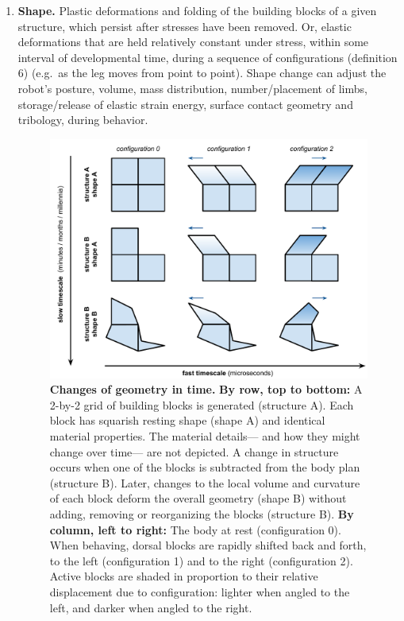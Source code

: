 \begin{enumerate}
    
    \item \textbf{Shape.} Plastic deformations and folding of the building blocks of a given structure, which persist after stresses have been removed.
    Or, elastic deformations that are held relatively constant under stress, within some interval of developmental time, during a sequence of configurations (definition 6) (e.g.~as the leg moves from point to point).
    Shape change can adjust the robot's posture, volume, mass distribution, number/placement of limbs, storage/release of elastic strain energy, surface contact geometry and tribology, during behavior.
    
    \begin{figure}[H]
        \centering
        \vspace{-2pt}
        \includegraphics[width=0.9\linewidth]{fig/ontology.pdf}
        \caption{%
        \textbf{Changes of geometry in time.}
        \textbf{By row, top to bottom:}
        A 2-by-2 grid of building blocks is generated (structure A).
        Each block has squarish resting shape (shape A) and identical material properties.
        The material details---%
        and how they might change over time---%
        are not depicted.
        A change in structure occurs when one of the blocks is subtracted from the body plan (structure B).
        Later, changes to the local volume and curvature of each block deform the overall geometry (shape B) without adding, removing or reorganizing the blocks (structure B).
        \textbf{By column, left to right:}
        The body at rest (configuration 0).
        When behaving, dorsal blocks are rapidly shifted back and forth, to the left (configuration 1) and to the right (configuration 2).
        Active blocks are shaded in proportion to their relative displacement due to configuration: lighter when angled to the left, and darker when angled to the right.
        \label{fig:ontology}%
        }
    \end{figure}
    

\end{enumerate}
